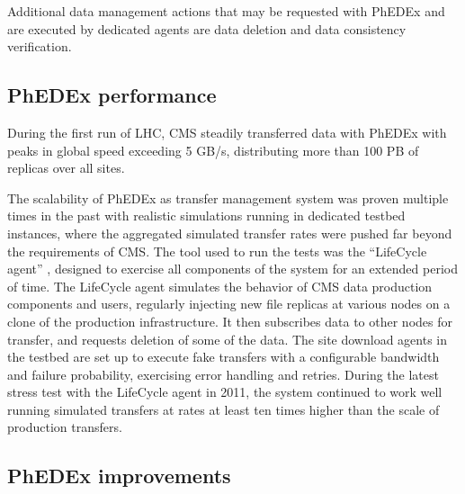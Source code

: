 Additional data management actions that may be requested with PhEDEx and are executed by dedicated agents are data deletion and data consistency verification.

\subsection{PhEDEx performance}


During the first run of LHC, CMS steadily transferred data with PhEDEx with peaks in global speed exceeding 5 GB/s, distributing more than 100 PB of replicas over all sites.


The scalability of PhEDEx as transfer management system was proven multiple times in the past with realistic simulations running in dedicated testbed instances, where the aggregated simulated transfer rates were pushed far beyond the requirements of CMS. The tool used to run the tests was the ``LifeCycle agent'' \cite{lifecycle}, designed to exercise all components of the system for an extended period of time.
The LifeCycle agent simulates the behavior of CMS data production components and users, regularly injecting new file replicas at various
nodes on a clone of the production infrastructure. It then subscribes data to other nodes for transfer, and requests deletion of some of the data.
The site download agents in the testbed are set up to execute fake transfers with a configurable bandwidth and failure probability, exercising error handling and retries.
During the latest stress test with the LifeCycle agent in 2011, the system continued to work well running simulated transfers at rates at least ten times higher than the scale of production transfers.


\subsection{PhEDEx improvements}

